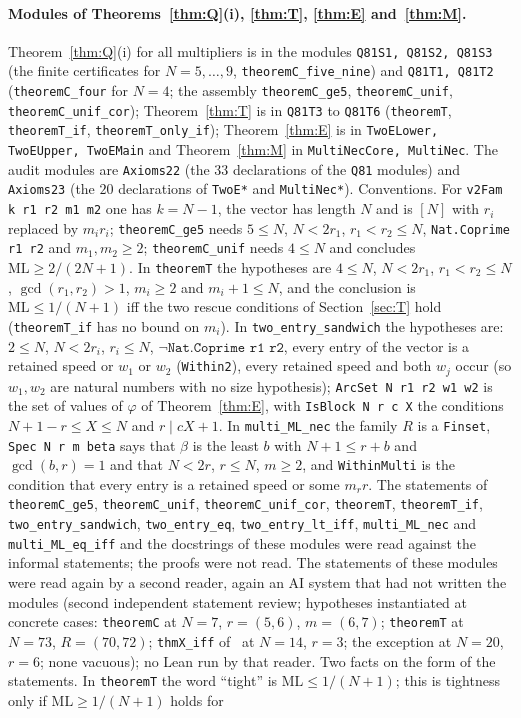 \documentclass[11pt]{article}
\theoremstyle{definition}
\theoremstyle{remark}
\newcommand{\ML}{\mathrm{ML}}
\begin{document}
\paragraph{Modules of Theorems~\ref{thm:Q}(i), \ref{thm:T}, \ref{thm:E} and~\ref{thm:M}.}
Theorem~\ref{thm:Q}(i) for all multipliers is in the modules \texttt{Q81S1, Q81S2, Q81S3} (the finite certificates for $N=5,\dots,9$, \texttt{theoremC\_five\_nine}) and \texttt{Q81T1, Q81T2} (\texttt{theoremC\_four} for $N=4$; the assembly \texttt{theoremC\_ge5}, \texttt{theoremC\_unif}, \texttt{theoremC\_unif\_cor}); Theorem~\ref{thm:T} is in \texttt{Q81T3} to \texttt{Q81T6} (\texttt{theoremT}, \texttt{theoremT\_if}, \texttt{theoremT\_only\_if}); Theorem~\ref{thm:E} is in \texttt{TwoELower, TwoEUpper, TwoEMain} and Theorem~\ref{thm:M} in \texttt{MultiNecCore, MultiNec}. The audit modules are \texttt{Axioms22} (the $33$ declarations of the \texttt{Q81} modules) and \texttt{Axioms23} (the $20$ declarations of \texttt{TwoE*} and \texttt{MultiNec*}). Conventions. For \texttt{v2Fam k r1 r2 m1 m2} one has $k=N-1$, the vector has length $N$ and is $[N]$ with $r_i$ replaced by $m_ir_i$; \texttt{theoremC\_ge5} needs $5\le N$, $N<2r_1$, $r_1<r_2\le N$, \texttt{Nat.Coprime r1 r2} and $m_1,m_2\ge2$; \texttt{theoremC\_unif} needs $4\le N$ and concludes $\ML\ge2/(2N+1)$. In \texttt{theoremT} the hypotheses are $4\le N$, $N<2r_1$, $r_1<r_2\le N$, $\gcd(r_1,r_2)>1$, $m_i\ge2$ and $m_i+1\le N$, and the conclusion is $\ML\le1/(N+1)$ iff the two rescue conditions of Section~\ref{sec:T} hold (\texttt{theoremT\_if} has no bound on $m_i$). In \texttt{two\_entry\_sandwich} the hypotheses are: $2\le N$, $N<2r_i$, $r_i\le N$, $\neg\texttt{Nat.Coprime r1 r2}$, every entry of the vector is a retained speed or $w_1$ or $w_2$ (\texttt{Within2}), every retained speed and both $w_j$ occur (so $w_1,w_2$ are natural numbers with no size hypothesis); \texttt{ArcSet N r1 r2 w1 w2} is the set of values of $\varphi$ of Theorem~\ref{thm:E}, with \texttt{IsBlock N r c X} the conditions $N+1-r\le X\le N$ and $r\mid cX+1$. In \texttt{multi\_ML\_nec} the family $R$ is a \texttt{Finset}, \texttt{Spec N r m beta} says that $\beta$ is the least $b$ with $N+1\le r+b$ and $\gcd(b,r)=1$ and that $N<2r$, $r\le N$, $m\ge2$, and \texttt{WithinMulti} is the condition that every entry is a retained speed or some $m_rr$. The statements of \texttt{theoremC\_ge5}, \texttt{theoremC\_unif}, \texttt{theoremC\_unif\_cor}, \texttt{theoremT}, \texttt{theoremT\_if}, \texttt{two\_entry\_sandwich}, \texttt{two\_entry\_eq}, \texttt{two\_entry\_lt\_iff}, \texttt{multi\_ML\_nec} and \texttt{multi\_ML\_eq\_iff} and the docstrings of these modules were read against the informal statements; the proofs were not read. The statements of these modules were read again by a second reader, again an AI system that had not written the modules (second independent statement review; hypotheses instantiated at concrete cases: \texttt{theoremC} at $N=7$, $r=(5,6)$, $m=(6,7)$; \texttt{theoremT} at $N=73$, $R=(70,72)$; \texttt{thmX\_iff} of~\cite{A1} at $N=14$, $r=3$; the exception at $N=20$, $r=6$; none vacuous); no Lean run by that reader. Two facts on the form of the statements. In \texttt{theoremT} the word ``tight'' is $\ML\le1/(N+1)$; this is tightness only if $\ML\ge1/(N+1)$ holds for 
\end{document}
